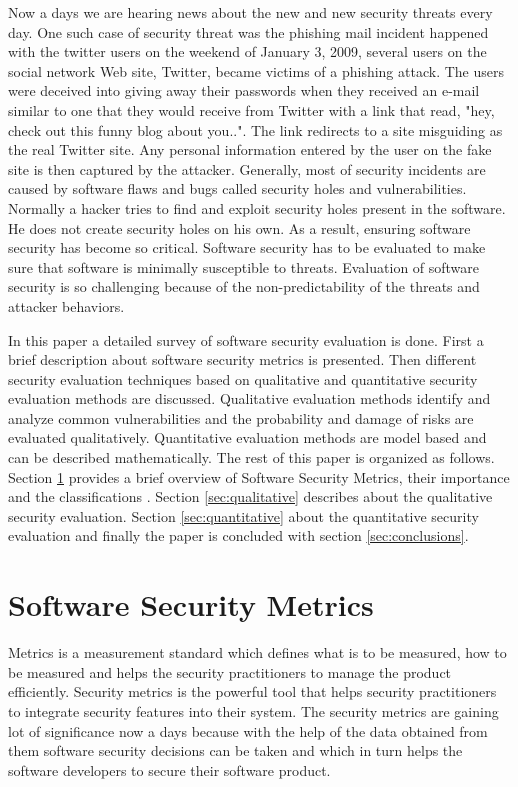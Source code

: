 \documentclass[pdftex,english,oribibl]{llncs}
\begin{document}
  Now a days we are hearing news about the new and new security threats every day. One such case of security threat was the phishing mail incident happened with the twitter users on the weekend of January 3, 2009, several users on the social network Web site, Twitter, became victims of a phishing attack. The users were deceived into giving away their passwords when they received an e-mail similar to one that they would receive from Twitter with a link that read, "hey, check out this funny blog about you..". The link redirects to a site misguiding as the real Twitter site. Any personal information entered by the user on the fake site is then captured by the attacker. Generally, most of security incidents are caused by software flaws and bugs called security holes and vulnerabilities. Normally a hacker tries to find and exploit security holes present in the software. He does not create security holes on his own. As a result, ensuring software security has become so critical. Software security has to be evaluated to make sure that software is minimally susceptible to threats. Evaluation of software security is so challenging because of the non-predictability of the threats and attacker behaviors. 

  In this paper a detailed survey of software security evaluation is done. First a brief description about software security metrics is presented. Then different security evaluation techniques based on qualitative and quantitative security evaluation methods are discussed. Qualitative evaluation methods identify and analyze common vulnerabilities and the probability and damage of risks are evaluated qualitatively. Quantitative evaluation methods are model based and can be described mathematically. The rest of this paper is organized as follows. Section \ref{sec:softwaremetrics} provides a brief overview of Software Security Metrics, their importance and the classifications . Section \ref{sec:qualitative} describes about the qualitative security evaluation. Section \ref{sec:quantitative} about the quantitative security evaluation and finally the paper is concluded with section \ref{sec:conclusions}.


\section{Software Security Metrics}\label{sec:softwaremetrics}
Metrics is a measurement standard which defines what is to be measured, how to be measured and helps the security practitioners to manage the product efficiently. Security metrics is the powerful tool that helps security practitioners to integrate security features into their system. The security metrics are gaining lot of significance now a days because with the help of the data obtained from them software security decisions can be taken and which in turn helps the software developers to secure their software product. 
\end{document}

